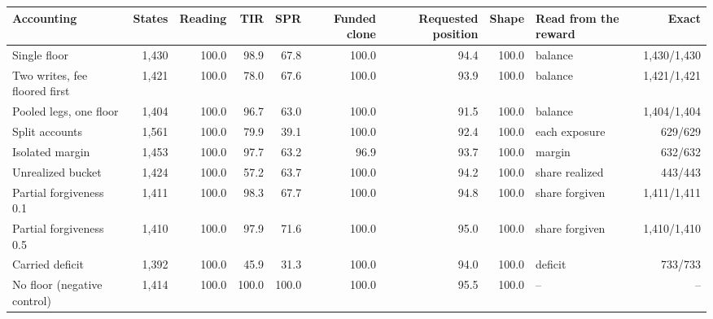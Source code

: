 \begin{tabular}{@{}lrrrrrrrlr@{}}
\toprule
Accounting & States & Reading & TIR & SPR & Funded clone & Requested position & Shape & Read from the reward & Exact \\
\midrule
Single floor & 1{,}430 & 100.0 & 98.9 & 67.8 & 100.0 & 94.4 & 100.0 & balance & 1{,}430/1{,}430 \\
Two writes, fee floored first & 1{,}421 & 100.0 & 78.0 & 67.6 & 100.0 & 93.9 & 100.0 & balance & 1{,}421/1{,}421 \\
Pooled legs, one floor & 1{,}404 & 100.0 & 96.7 & 63.0 & 100.0 & 91.5 & 100.0 & balance & 1{,}404/1{,}404 \\
Split accounts & 1{,}561 & 100.0 & 79.9 & 39.1 & 100.0 & 92.4 & 100.0 & each exposure & 629/629 \\
Isolated margin & 1{,}453 & 100.0 & 97.7 & 63.2 & 96.9 & 93.7 & 100.0 & margin & 632/632 \\
Unrealized bucket & 1{,}424 & 100.0 & 57.2 & 63.7 & 100.0 & 94.2 & 100.0 & share realized & 443/443 \\
Partial forgiveness 0.1 & 1{,}411 & 100.0 & 98.3 & 67.7 & 100.0 & 94.8 & 100.0 & share forgiven & 1{,}411/1{,}411 \\
Partial forgiveness 0.5 & 1{,}410 & 100.0 & 97.9 & 71.6 & 100.0 & 95.0 & 100.0 & share forgiven & 1{,}410/1{,}410 \\
Carried deficit & 1{,}392 & 100.0 & 45.9 & 31.3 & 100.0 & 94.0 & 100.0 & deficit & 733/733 \\
No floor (negative control) & 1{,}414 & 100.0 & 100.0 & 100.0 & 100.0 & 95.5 & 100.0 & -- & -- \\
\bottomrule
\end{tabular}
